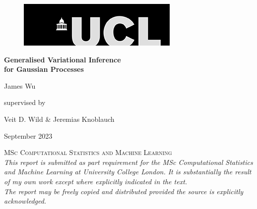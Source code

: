 \documentclass{article}
\numberwithin{equation}{section}
\begin{document}
\onehalfspacing
\begin{titlepage}
	\centering
\begin{figure}[h!]
\begin{flushright}
    \includegraphics[width=.333\textwidth]{thesis_report/figures/ucl_logo.png}
\end{flushright}
\end{figure}
    {}
	\vspace{3cm}

	{\Huge\bfseries Generalised Variational Inference \\ for Gaussian Processes\par}

	\vspace{1cm}
	{\LARGE James Wu\par}
    \vspace{0.5cm}
	supervised by\par
    \Large{Veit D. Wild \& Jeremias Knoblauch}\\
	\vfill
	{\large September 2023\par}
 \textsc{MSc Computational Statistics and Machine Learning}\\
	\vspace{1cm}
 \textit{\scriptsize{This report is submitted as part requirement for the MSc Computational Statistics and Machine Learning at University College London. It is substantially the result of my own work except where explicitly indicated in the text. \\ The report may be freely copied and distributed provided the source is explicitly acknowledged.}}


\end{titlepage}
\newpage
\setcounter{page}{1}


\end{document}
